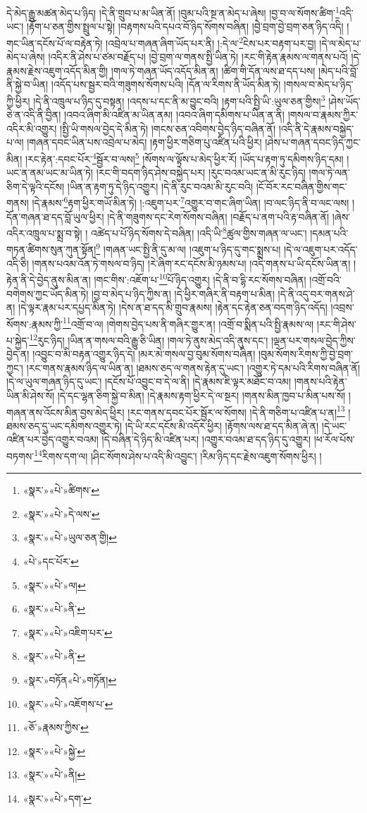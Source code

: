 དེ་མེད་རྒྱུ་མཚན་མེད་པ་ཉིད། །དེ་ནི་གྲུབ་པ་མ་ཡིན་ནོ། །བུམ་པའི་སྔ་ན་མེད་པ་ཞེས། །བྱ་བ་ལ་སོགས་ཚིག་\footnote{«སྣར་»«པེ་»ཚིགས་}འདི་ཡང་། །རྟོག་པ་ཅན་གྱིས་སྤྲུལ་པ་སྟེ། །བརྟགས་པའི་དཔའ་བོ་ཉིད་སོགས་བཞིན། །བྱེ་བྲག་བྱེ་བྲག་ཅན་ཉིད་འདི། །གང་ཡིན་དངོས་པོ་ལ་བརྟེན་ཏེ། །འབྲེལ་པ་གཞན་ཞིག་ཡོད་པར་ནི། །:དེ་ལ་\footnote{«སྣར་»«པེ་»དེ་ལས་}ངེས་པར་བརྟག་པར་བྱ། །དེ་ལ་མེད་པ་མེད་པ་ཞེས། །འདིར་ནི་ཤེས་པ་ཙམ་བརྗོད་པ། །བྱེ་བྲག་ལ་གནས་སྤྱི་ཡིན་ཏེ། །རང་གི་རྟེན་རྣམས་ལ་གནས་པའོ། །དེ་རྣམས་རྗེས་འཇུག་འདོད་མིན་གྱི། །གལ་ཏེ་གཞན་ཡོད་འདོད་མིན་ན། །ཚིག་གི་དོན་ལས་ཐ་དད་པས། །མེད་པའི་བློ་ནི་སྐྱེ་བ་ཡིན། །འདོད་པས་སྦྱར་བའི་གཟུགས་སོགས་པའི། །དོན་ལ་རིགས་ནི་ཡོད་མིན་ཏེ། །གསལ་བ་མེད་པ་ཉིད་ཀྱི་ཕྱིར། །དེ་ནི་འཁྲུལ་པ་ཉིད་དུ་བསྟན། །འདས་པ་དང་ནི་མ་བྱུང་བའི། །རྟག་པའི་སྤྱི་ཡི་:ཡུལ་ཅན་གྱིས།\footnote{«སྣར་»«པེ་»ཡུལ་ཅན་གྱི།} །ཤེས་ཡོད་ཅེ་ན་འདི་ནི་བྱིན། །འབའ་ཞིག་མི་འཛིན་མ་ཡིན་ནམ། །འབའ་ཞིག་དམིགས་པ་ཡིན་ན་ནི། །གསལ་བ་རྣམས་ཀྱིར་འདིར་མི་འགྱུར། །སྤྱི་ཡི་གསལ་བྱེད་དེ་མིན་ཏེ། །གངས་ཅན་འབིགས་བྱེད་ཉིད་བཞིན་ནོ། །འདི་ནི་དེ་རྣམས་བསྐྱེད་པ་ལ། །གཞན་དབང་ཡིན་པས་འབྲེལ་པ་མེད། །རྟག་ཕྱིར་གཅིག་པུ་འཛིན་པའི་ཕྱིར། །ཤེས་པ་གཞན་དབང་ཉིད་ཀྱང་མིན། །རང་རྟེན་:དབང་པོར་\footnote{«པེ་»དང་པོར་}སྦྱོར་བ་ལས།\footnote{«སྣར་»«པེ་»ལ།} །སོགས་ལ་ལྟོས་པ་མེད་ཕྱིར་རོ། །ཡོད་པ་རྟག་ཏུ་དམིགས་ཉིད་དམ། །ཡང་ན་ནམ་ཡང་མ་ཡིན་ཏེ། །རང་གི་བདག་ཉིད་ཤེས་བསྐྱེད་པར། །རུང་བའམ་ཡང་ན་མི་རུང་ཉིད། །གལ་ཏེ་ལན་ཅིག་དེ་ལྟའི་དངོས། །ཡིན་ན་རྟག་ཏུ་དེ་ཉིད་འགྱུར། །དེ་ནི་རུང་བའམ་མི་རུང་བའི། །ངོ་བོར་རང་བཞིན་གྱིས་གང་གནས། །དེ་རྣམས་\footnote{«སྣར་»«པེ་»ནི་}རྟག་ཕྱིར་གཡོ་མིན་ཏེ། །:འཇུག་པར་\footnote{«སྣར་»«པེ་»འཇིག་པར་}འགྱུར་བ་གང་ཞིག་ཡིན། །བ་ལང་ཉིད་ནི་བ་ལང་ལས། །དོན་གཞན་ཐ་དད་བློ་ཡུལ་ཕྱིར། །དེ་ནི་གཟུགས་དང་རེག་སོགས་བཞིན། །བརྗོད་པ་ནག་པའི་རྟ་བཞིན་ནོ། །ཞེས་འདིར་འཁྲུལ་པ་སྨྲ་བ་སྟེ། །
འཚེད་པ་པོ་ཉིད་སོགས་དེ་བཞིན། །འདི་ཡི་\footnote{«སྣར་»«པེ་»ནི་}ཚུལ་གྱིས་གཞན་ལ་ཡང་། །དམན་པའི་གཏན་ཚིགས་སུན་ཀུན་སྟོན།\footnote{«སྣར་»བཏོན«པེ་»གཏོན།} །གཞན་ཡང་སྤྱི་ནི་དུ་མ་ལ། །འཇུག་པ་ཉིད་དུ་གང་སྨྲས་པ། །དེ་ལ་འཇུག་པར་འདོད་འདི་ཅི། །གནས་པའམ་འོན་ཏེ་གསལ་བ་ཉིད། །རེ་ཞིག་རང་དངོས་མི་ཉམས་པ། །འདི་གནས་པ་ཡི་དངོས་ཡིན་ན། །རྟེན་ནི་དེ་བྱེད་ནུས་མིན་ན། །གང་གིས་:འཇོག་པ་\footnote{«སྣར་»«པེ་»འཇོགས་པ་}པོ་ཉིད་འགྱུར། །དེ་ནི་བ་དྷི་རང་སོགས་བཞིན། །འགྲོ་བའི་བགེགས་ཀྱང་ཡོད་མིན་ཏེ། །བྱ་བ་མེད་པ་ཉིད་ཀྱིས་ན། །དེ་ཕྱིར་གཞིར་ནི་བརྟག་པ་མིན། །དེ་ནི་འདུ་བར་གནས་ཤེ་ན། །དེ་ལྟར་རྣམ་པར་དཔྱད་མིན་ཏེ། །དེས་ན་ཐ་དད་མི་གྲུབ་རྣམས། །རྟེན་དང་རྟེན་ཅན་བདག་ཉིད་འདོད། །འབྲས་སོགས་:རྣམས་ཀྱི་\footnote{«ཅོ་»རྣམས་ཀྱིས་}འགྲོ་བ་ལ། །གེགས་བྱེད་པས་ནི་གཞིར་གྱུར་ན། །འགྲོ་བ་སྨིན་པའི་སྤྱི་རྣམས་ལ། །རང་གི་ཤེས་པ་སྐྱེད་\footnote{«སྣར་»«པེ་»སྐྱེ་}རུང་ཉིད། །ཡིན་ན་གསལ་བའི་རྒྱུ་ཅི་ཡིན། །གལ་ཏེ་ནུས་མེད་འདི་ནུས་དང་། །ལྡན་པར་གསལ་བྱེད་ཀྱིས་བྱེད་ན། །འབྱུང་བ་མི་བརྟན་འགྱུར་ཉིད་དེ། །མར་མེ་གསལ་བྱ་བུམ་སོགས་བཞིན། །བུམ་སོགས་རིགས་ཀྱི་བྱེ་བྲག་ཀྱང་། །རང་གནས་རྣམས་ཉིད་ལ་ཡིན་ན། །ཐམས་ཅད་ལ་གནས་རྟེན་དུ་ཡང་། །འགྱུར་ཏེ་དམ་པའི་རིགས་བཞིན་ནོ། །དེ་ལ་ཡུལ་གཞན་ཉིད་དུ་ཡང་། །དངོས་པོ་འབྱུང་བ་དེ་ལ་ནི། །དེ་རྣམས་ཇི་ལྟར་མཐོང་བ་འམ། །གནས་པའི་རྟེན་ཡིན་མི་ཤེས་སོ། །དེ་དང་ལྷན་ཅིག་སྐྱེ་བ་མིན། །དེ་རྣམས་རྟག་ཕྱིར་དེ་ལ་སྔར། །གནས་མིན་ཁྱབ་པ་མིན་པས་སོ། །གཞན་ནས་འོངས་མིན་བྱས་མེད་ཕྱིར། །རང་གནས་དབང་པོར་སྦྱོར་ལ་སོགས། །དེ་ནི་གཅིག་པ་འཛིན་པ་ན།\footnote{«སྣར་»«པེ་»ནི།} །ཐམས་ཅད་དུ་ཡང་དམིགས་འགྱུར་ཏེ། །དེ་ཡི་རང་དངོས་མི་འདོར་ཕྱིར། །རྟོགས་ལས་ཐ་དད་མིན་ཞེ་ན། །དེ་ཡང་འཛིན་པར་བྱེད་འགྱུར་བའམ། །དེ་བཞིན་དེ་ཉིད་མི་འཛིན་པར། །འགྱུར་བའམ་ཐ་དད་ཉིད་དུ་འགྱུར། །ཕ་རོལ་པོས་བཏགས་\footnote{«སྣར་»«པེ་»དག་}རིགས་དག་ལ། །ཤིང་སོགས་ཤེས་པ་འདི་མི་འབྱུང་། །རིམ་ཉིད་དང་རྗེས་འཇུག་སོགས་ཕྱིར། །
